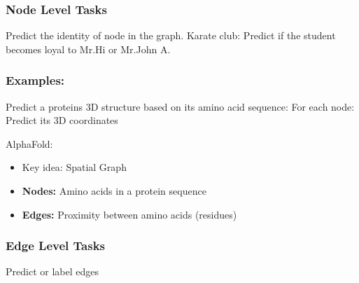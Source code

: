 \subsubsection{Node Level Tasks}
Predict the identity of node in the graph.
Karate club: Predict if the student becomes loyal to Mr.Hi or Mr.John A.
\subsubsection*{Examples:}

Predict a proteins 3D structure based on its amino acid sequence:
For each node: Predict its 3D coordinates

AlphaFold:
\begin{itemize}
    \item Key idea: Spatial Graph 
    \item \textbf{Nodes:} Amino acids in a protein sequence 
    \item \textbf{Edges:} Proximity between amino acids (residues) 
\end{itemize}

\subsubsection{Edge Level Tasks}
Predict or label edges 

